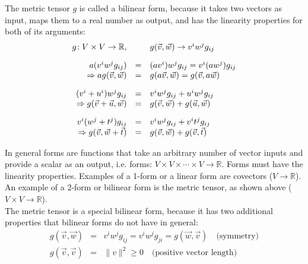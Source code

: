 The metric tensor $g$ is called a bilinear form, because it takes two vectors as input,
maps them to a real number as output, and has the linearity properties for both of its
arguments:
\begin{equation}
    \label{eq:metric_tensor_linearity_properties}
    \begin{array}{rcl}
        g\!: V \times V \rightarrow \mathbb{R},&&
        g(\vec{v},\vec{w}) \rightarrow v^i w^j g_{ij} \\
        \noalign{\vskip10pt}
        a(v^i w^j g_{ij}) &=& (av^i) w^j g_{ij} = v^i (aw^j) g_{ij} \\
        \Rightarrow ag(\vec{v},\vec{w}) &=& g(a\vec{v},\vec{w}) = g(\vec{v},a\vec{w}) \\
        \noalign{\vskip10pt}
        (v^i + u^i) w^j g_{ij} &=& v^i w^j g_{ij} + u^i w^j g_{ij} \\
        \Rightarrow g(\vec{v}+\vec{u},\vec{w}) &=& g(\vec{v},\vec{w}) + g(\vec{u},\vec{w}) \\
        \noalign{\vskip10pt}
        v^i (w^j + t^j) g_{ij} &=& v^i w^j g_{ij} + v^i t^j g_{ij} \\
        \Rightarrow g(\vec{v},\vec{w}+\vec{t}) &=& g(\vec{v},\vec{w}) + g(\vec{v},\vec{t})
    \end{array}
\end{equation}

In general forms are functions that take an arbitrary number of vector inputs and provide
a scalar as an output, i.e. forms: $V \times V \times \cdots \times V \rightarrow
\mathbb{R}$. Forms must have the linearity properties. Examples of a 1-form or a linear form
are covectors ($V \rightarrow \mathbb{R}$). An example of a 2-form or bilinear form is the
metric tensor, as shown above ($V \times V \rightarrow \mathbb{R}$). \\

The metric tensor is a special bilinear form, because it has two additional properties
that bilinear forms do not have in general:
\begin{equation}
    \label{eq:metric_tensor_special_additional_properties}
    \begin{array}{rcl}
        g(\vec{v},\vec{w}) &=& v^i w^j g_{ij} = v^i w^j g_{ji} = g(\vec{w},\vec{v})
        \quad\text{(symmetry)}\\
        g(\vec{v},\vec{v}) &=& \| v \|^2 \geq 0
        \quad\text{(positive vector length)}
    \end{array}
\end{equation} \\

